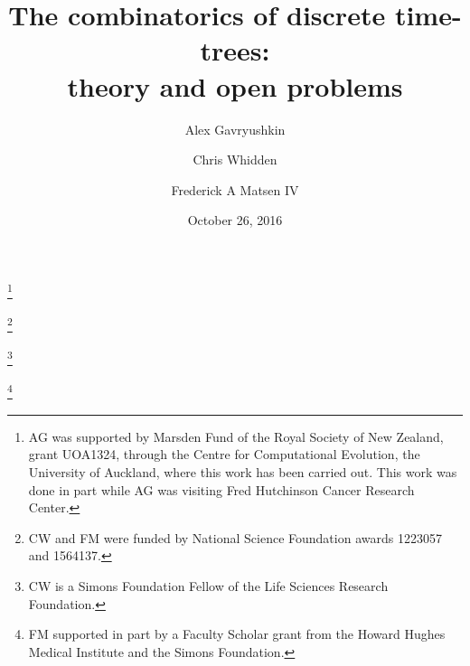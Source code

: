 \documentclass[11pt]{amsart}
\theoremstyle{definition}
\begin{document}
\title[The combinatorics of discrete time-trees]{The combinatorics of discrete time-trees:\\
theory and open problems}

\author{Alex Gavryushkin}
\address{Department of Biosystems Science and Engineering, ETH Z\"urich, 4058 Basel, Switzerland}


\author{Chris Whidden}
\address{Program in Computational Biology, Fred Hutchinson Cancer Research Center, Seattle, WA 98109}

\author{Frederick A Matsen IV}

\date{October 26, 2016}

\thanks{AG was supported by Marsden Fund of the Royal Society of New Zealand, grant UOA1324, through the Centre for Computational Evolution, the University of Auckland, where this work has been carried out.
This work was done in part while AG was visiting Fred Hutchinson Cancer Research Center.}

\thanks{CW and FM were funded by National Science Foundation awards 1223057 and 1564137.}

\thanks{CW is a Simons Foundation Fellow of the Life Sciences Research Foundation.}

\thanks{FM supported in part by a Faculty Scholar grant from the Howard Hughes Medical Institute and the Simons Foundation.}
\end{document}
